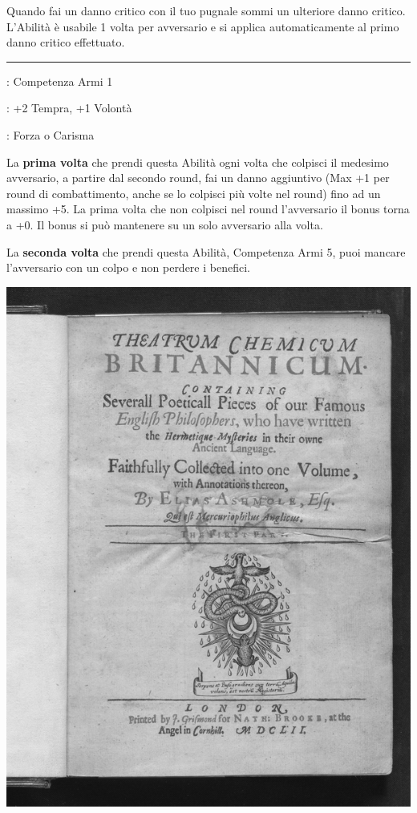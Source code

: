 \begin{multicols}{2}
Quando fai un danno critico con il tuo pugnale sommi un ulteriore danno critico. L'Abilità è usabile 1 volta per avversario e si applica automaticamente al primo danno critico effettuato.

\smallskip\noindent\rule{\linewidth}{2pt} \hypertarget{Questa è la mia arma!}{}\medskip{}
\noindent
\begin{description}[noitemsep, topsep=0pt, parsep=0pt, partopsep=0pt, leftmargin=0cm, labelwidth=2.5cm]
    \item[\textbf{Requisito}]: Competenza Armi 1
    \item[\textbf{Tiri Salvezza}]: +2 Tempra, +1 Volontà
    \item[\textbf{Caratteristica}]: Forza o Carisma
\end{description}

La \textbf{prima volta} che prendi questa Abilità ogni volta che colpisci il medesimo avversario, a partire dal secondo round, fai un danno aggiuntivo (Max +1 per round di combattimento, anche se lo colpisci più volte nel round) fino ad un massimo +5. La prima volta che non colpisci nel round l'avversario il bonus torna a +0. Il bonus si può mantenere su un solo avversario alla volta.

La \textbf{seconda volta} che prendi questa Abilità, Competenza Armi 5, puoi mancare l'avversario con un colpo e non perdere i benefici.

\begin{center}

	\includegraphics[width=0.7\linewidth]{immagini/Theatrum_Chemicum_Britannicum.png}


\end{center}
\end{multicols}
